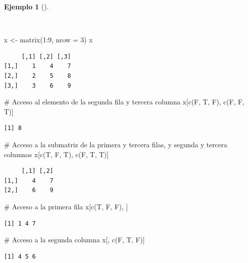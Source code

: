 \documentclass[
  a4paper,
]{scrreport}
\newenvironment{Shaded}{\begin{snugshade}}{\end{snugshade}}
\newcommand{\AttributeTok}[1]{\textcolor[rgb]{0.40,0.45,0.13}{#1}}
\newcommand{\CommentTok}[1]{\textcolor[rgb]{0.37,0.37,0.37}{#1}}
\newcommand{\DecValTok}[1]{\textcolor[rgb]{0.68,0.00,0.00}{#1}}
\newcommand{\FunctionTok}[1]{\textcolor[rgb]{0.28,0.35,0.67}{#1}}
\newcommand{\NormalTok}[1]{\textcolor[rgb]{0.00,0.23,0.31}{#1}}
\newcommand{\OtherTok}[1]{\textcolor[rgb]{0.00,0.23,0.31}{#1}}
\newcommand{\SpecialCharTok}[1]{\textcolor[rgb]{0.37,0.37,0.37}{#1}}
\theoremstyle{definition}
\theoremstyle{definition}
\newtheorem{example}{Ejemplo}[chapter]
\theoremstyle{remark}
\begin{document}
\begin{example}[]\protect\hypertarget{exm-acceso-matriz-logico}{}\label{exm-acceso-matriz-logico}

~

\begin{Shaded}
\begin{Highlighting}[]
\NormalTok{x }\OtherTok{\textless{}{-}} \FunctionTok{matrix}\NormalTok{(}\DecValTok{1}\SpecialCharTok{:}\DecValTok{9}\NormalTok{, }\AttributeTok{nrow =} \DecValTok{3}\NormalTok{)}
\NormalTok{x}
\end{Highlighting}
\end{Shaded}

\begin{verbatim}
     [,1] [,2] [,3]
[1,]    1    4    7
[2,]    2    5    8
[3,]    3    6    9
\end{verbatim}

\begin{Shaded}
\begin{Highlighting}[]
\CommentTok{\# Acceso al elemento de la segunda fila y tercera columna}
\NormalTok{x[}\FunctionTok{c}\NormalTok{(F, T, F), }\FunctionTok{c}\NormalTok{(F, F, T)]}
\end{Highlighting}
\end{Shaded}

\begin{verbatim}
[1] 8
\end{verbatim}

\begin{Shaded}
\begin{Highlighting}[]
\CommentTok{\# Acceso a la submatriz de la primera y tercera filas, y segunda y tercera columnas}
\NormalTok{x[}\FunctionTok{c}\NormalTok{(T, F, T), }\FunctionTok{c}\NormalTok{(F, T, T)]}
\end{Highlighting}
\end{Shaded}

\begin{verbatim}
     [,1] [,2]
[1,]    4    7
[2,]    6    9
\end{verbatim}

\begin{Shaded}
\begin{Highlighting}[]
\CommentTok{\# Acceso a la primera fila}
\NormalTok{x[}\FunctionTok{c}\NormalTok{(T, F, F), ]}
\end{Highlighting}
\end{Shaded}

\begin{verbatim}
[1] 1 4 7
\end{verbatim}

\begin{Shaded}
\begin{Highlighting}[]
\CommentTok{\# Acceso a la segunda columna}
\NormalTok{x[, }\FunctionTok{c}\NormalTok{(F, T, F)]}
\end{Highlighting}
\end{Shaded}

\begin{verbatim}
[1] 4 5 6
\end{verbatim}

\end{example}
\end{document}
